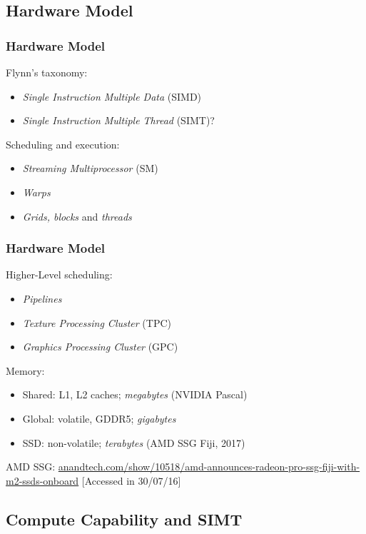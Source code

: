 \documentclass[10pt, compress]{beamer}
\begin{document}
\subsection{Hardware Model}

\begin{frame}
    \frametitle{Hardware Model}
    Flynn's taxonomy:
    \begin{itemize}
        \item \textit{Single Instruction Multiple Data} (SIMD)
            \pause
        \item \textit{Single Instruction Multiple Thread} (SIMT)?
    \end{itemize}
    \pause
    Scheduling and execution:
    \begin{itemize}
        \item \textit{Streaming Multiprocessor} (SM)
            \pause
        \item \textit{Warps}
            \pause
        \item \textit{Grids, blocks} and \textit{threads}
    \end{itemize}
\end{frame}

\begin{frame}
    \frametitle{Hardware Model}
    Higher-Level scheduling:
    \begin{itemize}
        \item \textit{Pipelines}
        \item \textit{Texture Processing Cluster} (TPC)
        \item \textit{Graphics Processing Cluster} (GPC)
    \end{itemize}
    \pause
    Memory:
    \begin{itemize}
        \item Shared: L1, L2 caches; \textit{megabytes} (NVIDIA Pascal)
        \item Global: volatile, GDDR5; \textit{gigabytes}
            \pause
        \item SSD: \alert{non-volatile}; \alert{\textit{terabytes}} (AMD SSG Fiji, 2017)
    \end{itemize}
    \vfill

    \tiny{AMD SSG: \url{anandtech.com/show/10518/amd-announces-radeon-pro-ssg-fiji-with-m2-ssds-onboard} [Accessed in 30/07/16]}
\end{frame}

\subsection{Compute Capability and SIMT}
\end{document}
